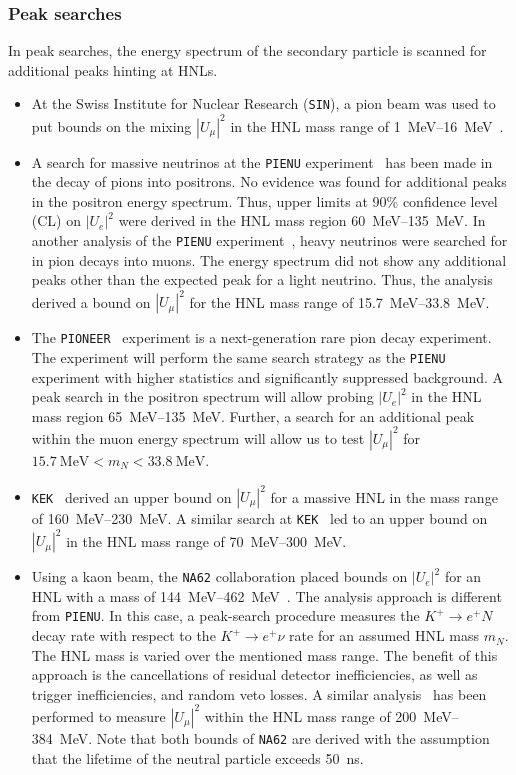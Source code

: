 \subsubsection{Peak searches}
%
In peak searches, the energy spectrum of the secondary particle is scanned for additional peaks hinting at HNLs. 

\begin{itemize}
    \item At the 
Swiss Institute for Nuclear Research (\texttt{SIN}), a pion beam was used to put bounds on the mixing $|U_\mu|^2$ in the 
HNL mass range of \SIrange{1}{16}{\MeV}~\cite{Daum:1987bg}. 

\item A search for massive neutrinos at the \texttt{PIENU} experiment~\cite{PIENU:2017wbj} has been made in the decay of pions into positrons.
No evidence was found for additional peaks in the positron energy spectrum.
Thus, upper limits at 90\% confidence level (CL) on $|U_e|^2$ were derived in the HNL mass region \SIrange{60}{135}{\MeV}. 
In another analysis of the \texttt{PIENU} experiment~\cite{PIENU:2019usb}, heavy neutrinos were searched for in pion decays into muons.
The energy spectrum did not show any additional peaks other than the expected peak for a light neutrino.
Thus, the analysis derived a bound on $|U_\mu|^2$ for the HNL mass range of \SIrange{15.7}{33.8}{\MeV}.

\item The \texttt{PIONEER}~\cite{PIONEER:2022alm} experiment is a next-generation rare pion decay experiment. The experiment will perform the 
same search strategy as the \texttt{PIENU} experiment with higher statistics and significantly suppressed background. A 
peak search in the positron spectrum will allow probing $|U_e|^2$ in the HNL mass region \SIrange{65}{135}{\MeV}. 
Further, a search for an additional peak within the muon energy spectrum will allow us to test $|U_\mu|^2$ for $\SI{15.7}
{\MeV} < m_N < \SI{33.8}{\MeV}$.

\item \texttt{KEK}~\cite{Asano:1981he} derived an upper bound on $|U_\mu|^2$ for a massive HNL in the mass range of \SIrange{160}{230}{\MeV}.
A similar search at \texttt{KEK}~\cite{Hayano:1982wu} led to an upper bound on $|U_\mu|^2$ in the HNL mass range of \SIrange{70}{300}{\MeV}.

\item Using a kaon beam, the \texttt{NA62} collaboration placed bounds on $|U_e|^2$ for an HNL with a mass of \SIrange{144}{462}{\MeV}~\cite{NA62:2020mcv}. The analysis approach is different from \texttt{PIENU}.
In this case, a peak-search procedure measures the $K^{+} \rightarrow e^{+} N$ decay rate with respect to the $K^{+} \rightarrow e^{+} \nu$ rate for an assumed HNL mass $m_N$. The HNL mass is varied over the mentioned mass range. The benefit of this approach is the cancellations of residual detector inefficiencies, as well as trigger inefficiencies, and random veto losses.
A similar analysis~\cite{NA62:2021bji} has been performed to measure $|U_\mu|^2$ within the HNL mass range of \SIrange{200}{384}{\MeV}. 
Note that both bounds of \texttt{NA62} are derived with the assumption that the lifetime of the neutral particle exceeds \SI{50}{\ns}.


\end{itemize}
